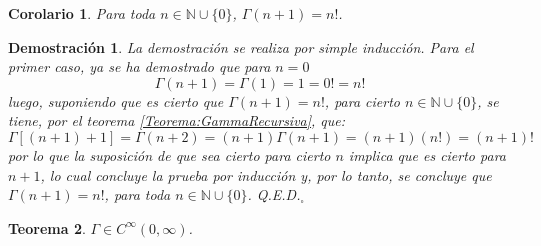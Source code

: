 \documentclass[a4paper,11pt]{article}
\theoremstyle{teoremas}
\newtheorem{teorema}{Teorema}[section]
\newtheorem{corolario}[teorema]{Corolario}
\theoremstyle{ejemplos}
\theoremstyle{definiciones}
\theoremstyle{lemas}
\newtheorem*{demostracion}{Demostraci\'on}
\begin{document}
\begin{corolario}
 Para toda $n \in \mathbb{N}\cup \{ 0 \}$, $\Gamma(n+1) = n!$.
\end{corolario}

\begin{demostracion}
 La demostraci\'on se realiza por simple inducci\'on. Para el primer caso, ya se ha demostrado que para $n=0$
 \begin{equation*}
  \Gamma(n+1) = \Gamma(1) = 1 = 0! = n!
 \end{equation*}
 luego, suponiendo que es cierto que $\Gamma(n+1) = n!$, para cierto $n \in \mathbb{N} \cup \{ 0 \}$, se tiene, por el teorema \ref{Teorema:GammaRecursiva}, que:
 \begin{equation*}
  \Gamma\left[(n+1) + 1\right] = \Gamma(n+2) = (n+1)\Gamma(n+1) = (n+1)\left( n! \right) = (n+1)!
 \end{equation*}
 por lo que la suposici\'on de que sea cierto para cierto $n$ implica que es cierto para $n+1$, lo cual concluye la prueba por inducci\'on y, por lo tanto, se concluye que $\Gamma(n+1) = n!$, para toda $n \in \mathbb{N} \cup \{ 0 \}$. Q.E.D.${}_{\square}$
\end{demostracion}

\begin{teorema}
 $\Gamma \in C^{\infty}(0,\infty)$.
\end{teorema}
\end{document}
